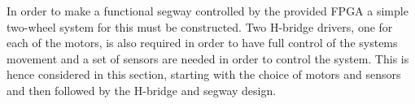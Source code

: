 
In order to make a functional segway controlled by the provided FPGA a simple two-wheel system for this must be constructed.
Two H-bridge drivers, one for each of the motors, is also required in order to have full control of the systems movement and a set of sensors are needed in order to control the system.
This is hence considered in this section, starting with the choice of motors and sensors and then followed by the H-bridge and segway design.